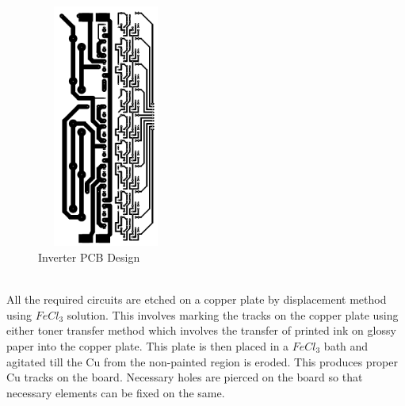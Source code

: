 \documentclass[12pt,a4paper]{report}
\begin{document}
\begin{minipage}{5.3cm}
	\begin{figure}[H]
		\begin{center}
 			\includegraphics[width=4.5cm,height=8cm]{figures/INVERTERB.PNG}
 		\end{center}
 		\caption{Inverter PCB Design}\label{DSPE}
 	\end{figure}
\end{minipage}\vspace{0.5in}\\

All the required circuits are etched on a copper plate by displacement method using $FeCl_3$ solution. This involves marking the tracks on the copper plate using either toner transfer method which involves the transfer of printed ink on glossy paper into the copper plate. This plate is then placed in a $FeCl_3$ bath and agitated till the Cu from the non-painted region is eroded. This produces proper Cu tracks on the board. Necessary holes are pierced on the board so that necessary elements can be fixed on the same.\\
\end{document}
